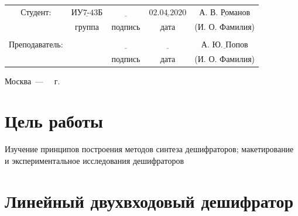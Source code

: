 \documentclass[a4paper,12pt]{article}
\begin{document}
\begin{center}
	\begin{tabular}{ccccc}
		Студент: & $\underline{\text{ИУ7-43Б}}$ & $\underline{\text{~~~~~~~~~~~}}$ & $\underline{\text{02.04.2020}}$ & $\underline{\text{А. В. Романов}}$ \\
		 & \footnotesize группа & \footnotesize подпись & \footnotesize дата  & \footnotesize (И. О. Фамилия) \\
		  &  &  &  & \\
		Преподаватель: & \textbf{} & $\underline{\text{~~~~~~~~~~~}}$ & $\underline{\text{~~~~~~~~~~~~}}$ & $\underline{\text{А. Ю. Попов}}$ \\
		&  & \footnotesize подпись & \footnotesize дата  & \footnotesize (И. О. Фамилия) \\
	\end{tabular}
\end{center}


\begin{center}
	\vfill
	Москва~---~\the\year
~г.
\end{center}
\clearpage

\section{Цель работы} Изучение принципов построения методов синтеза дешифраторов; макетирование и экспериментальное исследования дешифраторов

\section{Линейный двухвходовый дешифратор}
\end{document}
